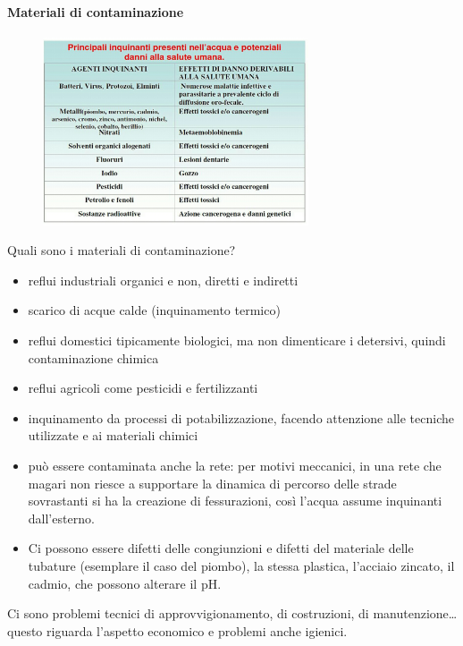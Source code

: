 \paragraph{Materiali di contaminazione}

\begin{figure}[!ht]
\centering
	\includegraphics[width=0.7\textwidth]{24/image3.jpeg}
	\end{figure}

Quali sono i materiali di contaminazione?

\begin{itemize}
\item
  reflui industriali organici e non, diretti e indiretti
\item
  scarico di acque calde (inquinamento termico)
\item
  reflui domestici tipicamente biologici, ma non dimenticare i
  detersivi, quindi contaminazione chimica
\item
  reflui agricoli come pesticidi e fertilizzanti
\item
  inquinamento da processi di potabilizzazione, facendo attenzione alle
  tecniche utilizzate e ai materiali chimici
\item
  può essere contaminata anche la rete: per motivi meccanici, in una
  rete che magari non riesce a supportare la dinamica di percorso delle
  strade sovrastanti si ha la creazione di fessurazioni, così l'acqua
  assume inquinanti dall'esterno.
\item
  Ci possono essere difetti delle congiunzioni e difetti del materiale
  delle tubature (esemplare il caso del piombo), la stessa plastica,
  l'acciaio zincato, il cadmio, che possono alterare il pH.
\end{itemize}

Ci sono problemi tecnici di approvvigionamento, di costruzioni, di
manutenzione\ldots{} questo riguarda l'aspetto economico e problemi
anche igienici.


